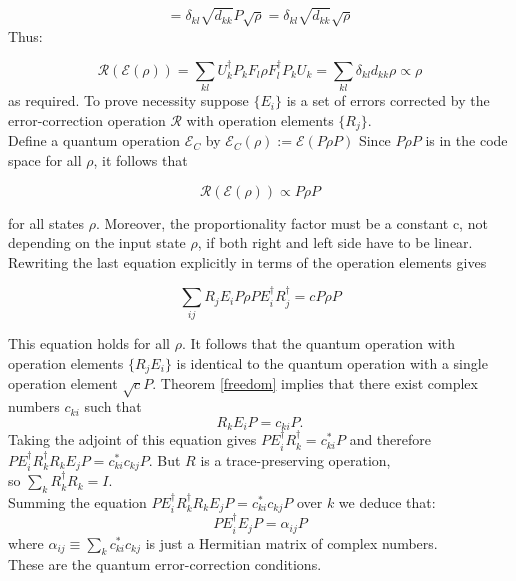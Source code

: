 \documentclass{article}
\begin{document}
\begin{equation}
	\label{conditionauxilary}
	= \delta_{kl} \sqrt{d_{kk}} P \sqrt{\rho} = \delta_{kl} \sqrt{d_{kk}} \sqrt{\rho}
\end{equation}
Thus:

\begin{equation}
	\mathcal{R}(\mathcal{E}(\rho)) = \sum_{kl} U_k^\dagger P_k F_l \rho F_l^\dagger P_k U_k = \sum_{kl} \delta_{kl} d_{kk} \rho \propto \rho
\end{equation}
as required.
\vspace{20pt}
To prove necessity suppose $\{E_i\}$ is a set of errors corrected by the error-correction
operation $\mathcal{R}$ with operation elements $\{R_j\}$.\\
Define a quantum operation $\mathcal{E}_C$ by $\mathcal{E}_C(\rho) := \mathcal{E}(P \rho P)$
Since $P \rho P$ is in the code space for all $\rho$, it follows that

\begin{equation}
	\mathcal{R}(\mathcal{E}(\rho)) \propto P \rho P
\end{equation}

\noindent for all states $\rho$. Moreover, the proportionality factor must be a constant c, not
depending on the input state $\rho$, if both right and left side have to be linear.
Rewriting the last equation explicitly in terms of the operation elements gives

\begin{equation}
	\sum_{ij} R_j E_i P \rho P E_i^\dagger R_j^\dagger = cP \rho P
\end{equation}

\noindent This equation holds for all $\rho$. It follows that the quantum operation with operation
elements $\{R_jE_i\}$ is identical to the quantum operation with a single operation element
$\sqrt{c}P$. Theorem \ref{freedom} implies that there exist complex numbers
$c_{ki}$ such that
\begin{equation}
	R_k E_i P = c_{ki} P.
\end{equation}
Taking the adjoint of this equation gives $P E_i^\dagger R_k^\dagger = c_{ki}^* P$ and therefore\\
$P E_i^\dagger R_k^\dagger R_k E_j P =
	c_{ki}^* c_{kj} P$.
But $R$ is a trace-preserving operation,\\
so $\sum_k R_k^\dagger R_k = I$. \\ Summing the equation $P E_i^\dagger R_k^\dagger R_k E_j P = c_{ki}^* c_{kj} P$
over $k$ we deduce that:
\begin{equation}
	P E_i^\dagger E_j P = \alpha_{ij} P
\end{equation}
where $\alpha_{ij} \equiv \sum_k c_{ki}^* c_{kj}$ is just a Hermitian matrix of complex numbers.\\
These are the quantum error-correction conditions.
\end{document}
